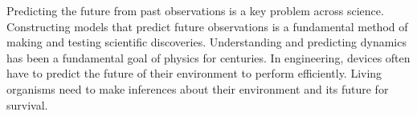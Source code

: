 \documentclass[11pt,letterpaper]{article}
\begin{document}


%
%
%
%
%
%
%
%
%



Predicting the future from past observations is a key problem across science.
Constructing models that predict future observations is a fundamental method of making and testing scientific discoveries.
Understanding and predicting dynamics has been a fundamental goal of physics for centuries.
In engineering, devices often have to predict the future of their environment to perform efficiently.
Living organisms need to make inferences about their environment and its future for survival.
\end{document}
